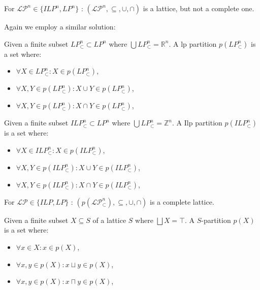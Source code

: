 \begin{theorem}\label{thm:lp-lattice}
    For $\mathcal{LP}^n \in \{ILP^n, LP^n\}$ : $(\mathcal{LP}^n, \subseteq, \cup, \cap)$ is a lattice, but not a complete one.
\end{theorem}

Again we employ a similar solution:

\begin{definition}
    Given a finite subset $LP_\subset^n \subset LP^n$ where $\bigcup LP_\subset^n = \mathbb{R}^n$.
    A \gls{lp} partition $p(LP_\subset^n)$ is a set where:
    \begin{itemize}
        \item $\forall X \in LP_\subset^n : X \in p(LP_\subset^n)$,
        \item $\forall X, Y \in p(LP_\subset^n) : X \cup Y \in p(LP_\subset^n)$,
        \item $\forall X, Y \in p(LP_\subset^n) : X \cap Y \in p(LP_\subset^n)$,
    \end{itemize}
\end{definition}

\begin{definition}
    Given a finite subset $ILP_\subset^n \subset LP^n$ where $\bigcup LP_\subset^n = \mathbb{Z}^n$.
    A I\gls{lp} partition $p(ILP_\subset^n)$ is a set where:
    \begin{itemize}
        \item $\forall X \in ILP_\subset^n : X \in p(ILP_\subset^n)$,
        \item $\forall X, Y \in p(ILP_\subset^n) : X \cup Y \in p(ILP_\subset^n)$,
        \item $\forall X, Y \in p(ILP_\subset^n) : X \cap Y \in p(ILP_\subset^n)$,
    \end{itemize}
\end{definition}

\begin{theorem}\label{thm:lp-partition-lattice}
    For $\mathcal{LP} \in \{ILP, LP\}$ : $(p(\mathcal{LP}_\subset^n), \subseteq, \cup, \cap)$ is a complete lattice.
\end{theorem}


\begin{definition}
    Given a finite subset $X \subseteq S$ of a lattice $S$ where $\bigsqcup X = \top$.
    A $S$-partition $p(X)$ is a set where:
    \begin{itemize}
        \item $\forall x \in X: x \in p(X)$,
        \item $\forall x, y \in p(X) : x \sqcup y \in p(X)$,
        \item $\forall x, y \in p(X) : x \sqcap y \in p(X)$,
    \end{itemize}
\end{definition}

